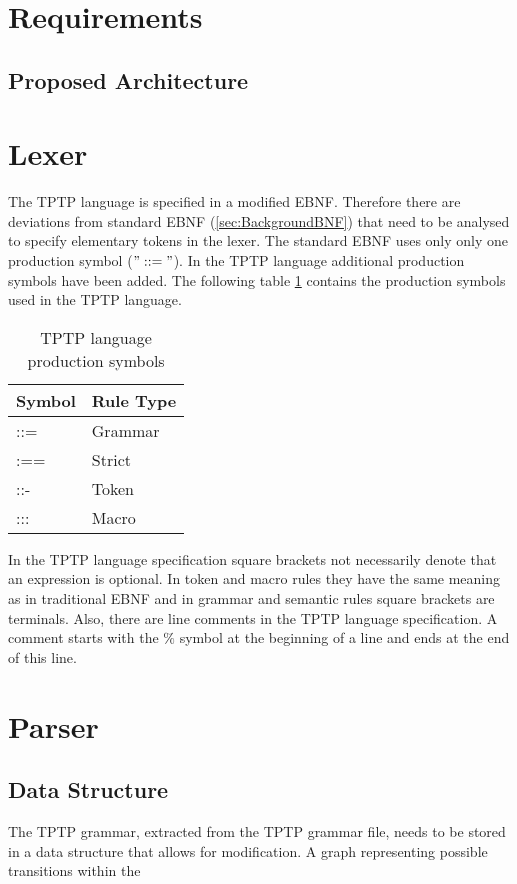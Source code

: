  \section{Requirements}\label{sec:ConceptRequirements}

\subsection{Proposed Architecture}\label{sec:ConceptProposedArchitecture}

\section{Lexer}
The \ac{TPTP} language is specified in a modified \ac{EBNF}.
Therefore there are deviations from standard \ac{EBNF} (\ref{sec:BackgroundBNF}) that need to be analysed to specify elementary tokens in the lexer.
The standard \ac{EBNF} uses only only one production symbol ($"::="$).
In the \ac{TPTP} language additional production symbols have been added.
The following table \ref{tbl:ConceptTPTPProductionSymbols} contains the production symbols used in the \ac{TPTP} language.

\begin{table}[H]
\centering
\renewcommand{\arraystretch}{1}
\caption{\ac{TPTP} language production symbols \cite{VS06}}
\begin{tabular}{ll}
\textbf{Symbol} & \textbf{Rule Type}\\\hline
::= & Grammar\\
:== & Strict\\
::- & Token\\
::: & Macro\\
\end{tabular}
\label{tbl:ConceptTPTPProductionSymbols}
\end{table}

In the \ac{TPTP} language specification square brackets not necessarily denote that an expression is optional.
In token and macro rules they have the same meaning as in traditional  \ac{EBNF} and in grammar and semantic rules square brackets are terminals.
Also, there are line comments in the \ac{TPTP} language specification. A comment starts with the $\%$ symbol at the beginning of a line and ends at the end of this line.

\section{Parser}
\subsection{Data Structure}
The \ac{TPTP} grammar, extracted from the \ac{TPTP} grammar file, needs to be stored in a data structure that allows for modification. A graph representing
possible transitions within the 
